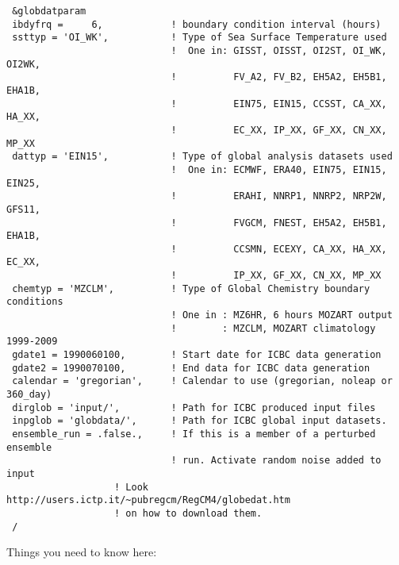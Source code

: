 {\footnotesize
\begin{Verbatim}
 &globdatparam
 ibdyfrq =     6,            ! boundary condition interval (hours)
 ssttyp = 'OI_WK',           ! Type of Sea Surface Temperature used
                             !  One in: GISST, OISST, OI2ST, OI_WK, OI2WK,
                             !          FV_A2, FV_B2, EH5A2, EH5B1, EHA1B,
                             !          EIN75, EIN15, CCSST, CA_XX, HA_XX,
                             !          EC_XX, IP_XX, GF_XX, CN_XX, MP_XX
 dattyp = 'EIN15',           ! Type of global analysis datasets used
                             !  One in: ECMWF, ERA40, EIN75, EIN15, EIN25,
                             !          ERAHI, NNRP1, NNRP2, NRP2W, GFS11,
                             !          FVGCM, FNEST, EH5A2, EH5B1, EHA1B,
                             !          CCSMN, ECEXY, CA_XX, HA_XX, EC_XX,
                             !          IP_XX, GF_XX, CN_XX, MP_XX
 chemtyp = 'MZCLM',          ! Type of Global Chemistry boundary conditions
                             ! One in : MZ6HR, 6 hours MOZART output
                             !        : MZCLM, MOZART climatology 1999-2009
 gdate1 = 1990060100,        ! Start date for ICBC data generation
 gdate2 = 1990070100,        ! End data for ICBC data generation
 calendar = 'gregorian',     ! Calendar to use (gregorian, noleap or 360_day)
 dirglob = 'input/',         ! Path for ICBC produced input files
 inpglob = 'globdata/',      ! Path for ICBC global input datasets.
 ensemble_run = .false.,     ! If this is a member of a perturbed ensemble
                             ! run. Activate random noise added to input
                   ! Look http://users.ictp.it/~pubregcm/RegCM4/globedat.htm
                   ! on how to download them.
 /
\end{Verbatim}
}

Things you need to know here:


